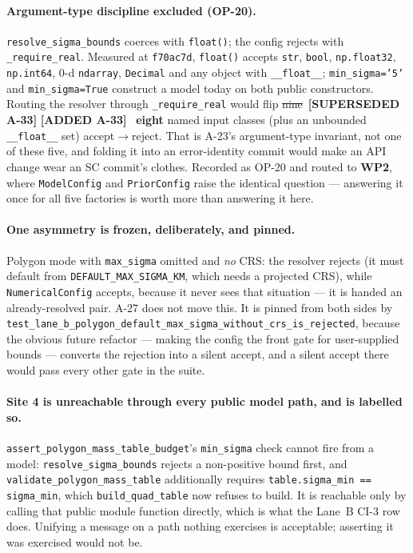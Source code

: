 \documentclass[
  10pt,
]{article}
\newcommand{\amdstrike}[1]{\sout{#1}}
\newcommand{\amdstrike}[1]{\textcolor{supcolor}{#1}}
\newcommand{\amdnew}[1]{{\color{amdcolor}\footnotesize\textbf{[ADDED #1]}}\ }
\newcommand{\supsd}[2]{{\color{supcolor}\amdstrike{#2}}~{\color{amdcolor}\footnotesize\textbf{[SUPERSEDED #1]}}}
\begin{document}
\paragraph{Argument-type discipline excluded (OP-20).}
\texttt{resolve\_sigma\_bounds} coerces with \texttt{float()}; the config rejects with \texttt{\_require\_real}. Measured at \texttt{f70ac7d}, \texttt{float()} accepts \texttt{str}, \texttt{bool}, \texttt{np.float32}, \texttt{np.int64}, 0-d \texttt{ndarray}, \texttt{Decimal} and any object with \texttt{\_\_float\_\_}; \texttt{min\_sigma='5'} and \texttt{min\_sigma=True} construct a model today on both public constructors. Routing the resolver through \texttt{\_require\_real} would flip \supsd{A-33}{nine} \amdnew{A-33} \textbf{eight} named input classes (plus an unbounded \texttt{\_\_float\_\_} set) accept$\rightarrow$reject. That is A-23's argument-type invariant, not one of these five, and folding it into an error-identity commit would make an API change wear an SC commit's clothes. Recorded as OP-20 and routed to \textbf{WP2}, where \texttt{ModelConfig} and \texttt{PriorConfig} raise the identical question --- answering it once for all five factories is worth more than answering it here.

\paragraph{One asymmetry is frozen, deliberately, and pinned.}
Polygon mode with \texttt{max\_sigma} omitted and \emph{no} CRS: the resolver rejects (it must default from \texttt{DEFAULT\_MAX\_SIGMA\_KM}, which needs a projected CRS), while \texttt{NumericalConfig} accepts, because it never sees that situation --- it is handed an already-resolved pair. A-27 does not move this. It is pinned from both sides by \texttt{test\_lane\_b\_polygon\_default\_max\_sigma\_without\_crs\_is\_rejected}, because the obvious future refactor --- making the config the front gate for user-supplied bounds --- converts the rejection into a silent accept, and a silent accept there would pass every other gate in the suite.

\paragraph{Site 4 is unreachable through every public model path, and is labelled so.}
\texttt{assert\_polygon\_mass\_table\_budget}'s \texttt{min\_sigma} check cannot fire from a model: \texttt{resolve\_sigma\_bounds} rejects a non-positive bound first, and \texttt{validate\_polygon\_mass\_table} additionally requires \texttt{table.sigma\_min == sigma\_min}, which \texttt{build\_quad\_table} now refuses to build. It is reachable only by calling that public module function directly, which is what the Lane~B CI-3 row does. Unifying a message on a path nothing exercises is acceptable; asserting it was exercised would not be.
\end{document}

